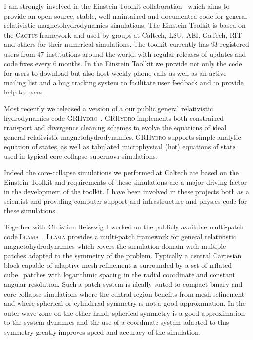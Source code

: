 \documentclass[12pt]{article}
\newcommand{\code}[1]{\textsc{#1}}
\newcommand{\ET}{Einstein Toolkit}
\newcommand{\GRHydro}{\code{GRHydro}}
\begin{document}
I am strongly involved in the \ET{}
collaboration~\cite{2012CQGra..29k5001L} which aims to
provide an open source, stable, well maintained and documented code for 
general relativistic magnetohydrodynamics simulations. The \ET{}
is based on the \code{Cactus} framework and used by groups at Caltech,
LSU, AEI, GaTech, RIT and others for their numerical simulations. The toolkit
currently has 93 registered users from 47 institutions around the world, with
regular releases of updates and code fixes every 6 months.  In the
\ET{} we provide not only the code for users to download but also host weekly
phone calls as well as an active mailing list and a bug tracking system to
facilitate user feedback and to provide help to users.

Most recently we released a version of a our public general relativistic
hydrodynamics code \GRHydro{}~\cite{2013arXiv1304.5544M}. \GRHydro{}
implements both constrained transport and divergence cleaning schemes to
evolve the equations of ideal general relativistic magnetohydrodynamics.
\GRHydro{} supports  simple analytic equation of states, as well as
tabulated microphysical (hot) equations of state used in typical core-collapse
supernova simulations.

Indeed the core-collapse simulations we performed at Caltech are based on the
\ET{} and requirements of these simulations are a major driving factor in
the development of the toolkit. I have been involved in these projects both as
a scientist and providing computer support and infrastructure and physics code
for these simulations.

Together with Christian Reisswig I worked on the publicly available
multi-patch code \code{Llama}~\cite{Pollney:2009yz}.
\code{Llama} provides a multi-patch framework for general relativistic
magnetohydrodynamics which covers the simulation domain with multiple patches
adapted to the symmetry of the problem. Typically a central Cartesian block
capable of adaptive mesh refinement is surrounded by a set of inflated
cube~\cite{Thornburg:2004dv} patches with logarithmic
spacing in the radial coordinate and constant angular resolution. Such a
patch system is ideally suited to compact binary and core-collapse simulations
where the central region benefits from mesh refinement and where spherical
or cylindrical symmetry is not a good approximation. In the outer wave zone on
the other hand, spherical symmetry is a good approximation to the system
dynamics and the use of a coordinate system adapted to this symmetry greatly
improves speed and accuracy of the simulation. 
\end{document}
